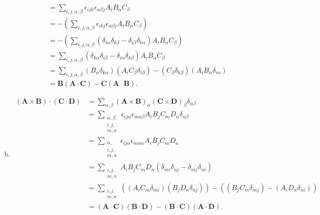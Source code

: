 \documentclass[10pt]{mypackage}
\begin{document}
\begin{enumerate}[(a)]
\begin{align*}
                                                                &= \sum_{i,j,\alpha,\beta}\epsilon_{ijk}\epsilon_{\alpha\beta j}A_{i} B_{\alpha}C_{\beta}\\
                                                                &= -\left(\sum_{i,j,\alpha,\beta}\epsilon_{ikj}\epsilon_{\alpha \beta j}A_{i}B_{\alpha}C_{\beta}\right)\\
                                                                &= -\left(\sum_{i,j,\alpha,\beta}\left(\delta_{i\alpha}\delta_{k\beta} - \delta_{i\beta}\delta_{k\alpha}\right)A_{i}B_{\alpha}C_{\beta}\right)\\
                                                                &= \sum_{i,j,\alpha,\beta}\left(\delta_{k\alpha}\delta_{i\beta} - \delta_{i\alpha}\delta_{k\beta}\right)A_iB_{\alpha}C_{\beta}\\
                                                                &= \sum_{i,j,\alpha,\beta}\left(B_{\alpha}\delta_{k\alpha}\right)\left(A_{i}C_{\beta}\delta_{i\beta}\right) - \left(C_{\beta}\delta_{k\beta}\right)\left(A_{i}B_{\alpha}\delta_{i\alpha}\right)\\
                                                                &= \mathbf{B}\left(\mathbf{A}\cdot \mathbf{C}\right) - \mathbf{C}\left(\mathbf{A}\cdot \mathbf{B}\right).
    \end{align*}
  \item 
    \begin{align*}
      \left(\mathbf{A}\times \mathbf{B}\right)\cdot \left(\mathbf{C}\cdot \mathbf{D}\right) &= \sum_{\alpha,\beta}\left(\mathbf{A}\times \mathbf{B}\right)_{\alpha}\left(\mathbf{C}\times \mathbf{D}\right)_{\beta}\delta_{\alpha\beta}\\
                  &= \sum_{\substack{\alpha,\beta,\\i,j,\\m,n}}\epsilon_{ij\alpha}\epsilon_{mn\beta}A_iB_jC_mD_n\delta_{\alpha\beta}\\
                  &= \sum_{\substack{\alpha,\\i,j,\\m,n}}\epsilon_{ij\alpha}\epsilon_{mn\alpha}A_iB_jC_mD_n\\
                  &= \sum_{\substack{i,j,\\m,n}}A_iB_jC_mD_n\left(\delta_{mi}\delta_{nj} - \delta_{mj}\delta_{ni}\right)\\
                  &= \sum_{\substack{i,j,\\m,n}}\left(\left(A_iC_m\delta_{mi}\right)\left(B_jD_n\delta_{nj}\right)\right) - \left(\left(B_jC_m\delta_{mj}\right) - \left(A_iD_n\delta_{ni}\right)\right)\\
                  &= \left(\mathbf{A}\cdot \mathbf{C}\right)\left(\mathbf{B}\cdot \mathbf{D}\right) - \left(\mathbf{B}\cdot \mathbf{C}\right)\left(\mathbf{A}\cdot \mathbf{D}\right).
    \end{align*}
\end{enumerate}
\end{document}
